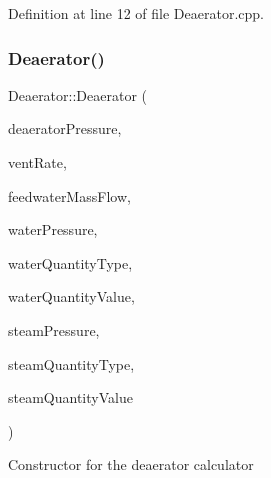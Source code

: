 Definition at line 12 of file Deaerator.\+cpp.

\mbox{\label{class_deaerator_a02311c34cbe46384187292e5f844984c}} 
\subsubsection{\texorpdfstring{Deaerator()}{Deaerator()}\hspace{0.1cm}{\footnotesize\ttfamily [2/3]}}
{\footnotesize\ttfamily Deaerator\+::\+Deaerator (\begin{DoxyParamCaption}\item[{double}]{deaerator\+Pressure,  }\item[{double}]{vent\+Rate,  }\item[{double}]{feedwater\+Mass\+Flow,  }\item[{double}]{water\+Pressure,  }\item[{\hyperlink{class_steam_properties_ae0294bedf7d178c2d8fb6aed0f62fbff}{Steam\+Properties\+::\+Thermodynamic\+Quantity}}]{water\+Quantity\+Type,  }\item[{double}]{water\+Quantity\+Value,  }\item[{double}]{steam\+Pressure,  }\item[{\hyperlink{class_steam_properties_ae0294bedf7d178c2d8fb6aed0f62fbff}{Steam\+Properties\+::\+Thermodynamic\+Quantity}}]{steam\+Quantity\+Type,  }\item[{double}]{steam\+Quantity\+Value }\end{DoxyParamCaption})}

Constructor for the deaerator calculator


